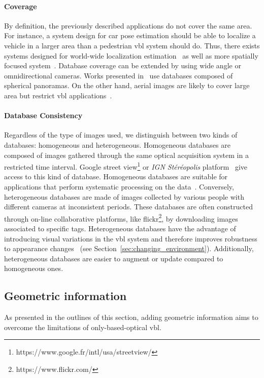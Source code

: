 		\paragraph{Coverage}			
			By definition, the previously described applications do not cover the same area. For instance, a system design for car pose estimation should be able to localize a vehicle in a larger area than a pedestrian \ac{vbl} system should do. Thus, there exists systems designed for world-wide localization estimation~\citep{Hays2008,Weyand2016,Vo2017} as well as more spatially focused system~\citep{Song2016}. Database coverage can be extended by using wide angle or omnidirectional cameras. Works presented in~\citep{Arandjelovic2017,Iscen2017,Kumar2016mastersThesis,Ramalingam2010,Torii2011,Zamir2010,Zamir2014} use databases composed of spherical panoramas. On the other hand, aerial images are likely to cover large area but restrict \ac{vbl} applications~\citep{Wan2016}.
			
		\paragraph{Database Consistency}
			\label{para:data_consistency}
			Regardless of the type of images used, we distinguish between two kinds of databases: homogeneous and heterogeneous. Homogeneous databases are composed of images gathered through the same optical acquisition system in a restricted time interval. Google street view\footnote{https://www.google.fr/intl/usa/streetview/} or \textit{IGN St\'er\'eopolis} platform~\citep{Paparoditis2012} give access to this kind of database. Homogeneous databases are suitable for applications that perform systematic processing on the data~\citep{Majdik2013,Torii2015}. Conversely, heterogeneous databases are made of images collected by various people with different cameras at inconsistent periods. These databases are often constructed through on-line collaborative platforms, like flickr\footnote{https://www.flickr.com/}, by downloading images associated to specific tags. Heterogeneous databases have the advantage of introducing visual variations in the \ac{vbl} system and therefore improves robustness to appearance changes~\citep{Radenovic2016,Gordo2016} (see Section~\ref{sec:changing_environment}). Additionally, heterogeneous databases are easier to augment or update compared to homogeneous ones.
			
	\subsection{Geometric information}
		\label{subsec:geometric_info}
		As presented in the outlines of this section, adding geometric information aims to overcome the limitations of only-based-optical \ac{vbl}.
        
